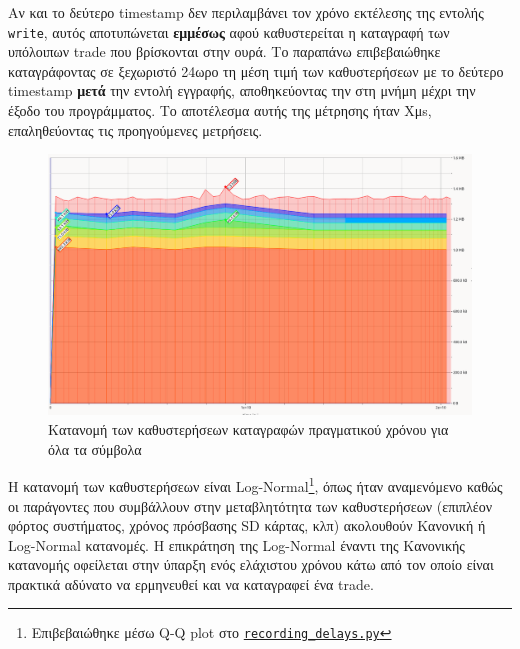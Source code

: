 \documentclass[12pt]{article}
\newcommand{\scripts}[1]{\href{https://github.com/Selivanof/university-collection/tree/main/RealTime_Embedded_Systems/scripts}{\texttt{#1}}}
\begin{document}
Αν και το δεύτερο timestamp δεν περιλαμβάνει τον χρόνο εκτέλεσης της εντολής \texttt{write}, αυτός αποτυπώνεται \textbf{εμμέσως} αφού καθυστερείται η καταγραφή των υπόλοιπων trade που βρίσκονται στην ουρά. Το παραπάνω επιβεβαιώθηκε καταγράφοντας σε ξεχωριστό 24ωρο τη μέση τιμή των καθυστερήσεων με το δεύτερο timestamp \textbf{μετά} την εντολή εγγραφής, αποθηκεύοντας την στη μνήμη μέχρι την έξοδο του προγράμματος. Το αποτέλεσμα αυτής της μέτρησης ήταν Xμs, επαληθεύοντας τις προηγούμενες μετρήσεις.

\begin{figure}[H]
    \centering
    \begin{minipage}{0.75\textwidth}
        \centering
        \includegraphics[width=\linewidth]{massif.png} %
        \caption{Κατανομή των καθυστερήσεων καταγραφών πραγματικού χρόνου για όλα τα σύμβολα}
        \label{fig:massif}
    \end{minipage}
\end{figure}

Η κατανομή των καθυστερήσεων είναι Log-Normal\footnote{Επιβεβαιώθηκε μέσω Q-Q plot στο \scripts{recording\_delays.py}}, όπως ήταν αναμενόμενο καθώς οι παράγοντες που συμβάλλουν στην μεταβλητότητα των καθυστερήσεων (επιπλέον φόρτος συστήματος, χρόνος πρόσβασης SD κάρτας, κλπ) ακολουθούν Κανονική ή Log-Normal κατανομές. Η επικράτηση της Log-Normal έναντι της Κανονικής κατανομής οφείλεται στην ύπαρξη ενός ελάχιστου χρόνου κάτω από τον οποίο είναι πρακτικά αδύνατο να ερμηνευθεί και να καταγραφεί ένα trade.
\end{document}
